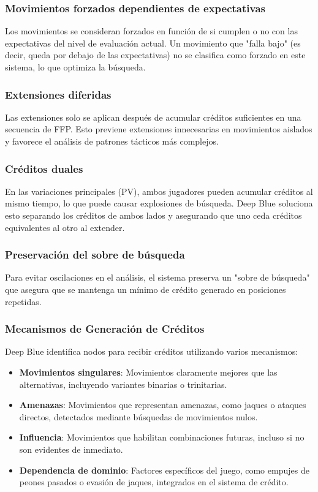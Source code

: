 \documentclass[12pt,a4paper]{article}
\begin{document}
\subsubsection*{Movimientos forzados dependientes de expectativas}
Los movimientos se consideran forzados en función de si cumplen o no con las expectativas del nivel de evaluación actual. Un movimiento que "falla bajo" (es decir, queda por debajo de las expectativas) no se clasifica como forzado en este sistema, lo que optimiza la búsqueda.

\subsubsection*{Extensiones diferidas}
Las extensiones solo se aplican después de acumular créditos suficientes en una secuencia de FFP. Esto previene extensiones innecesarias en movimientos aislados y favorece el análisis de patrones tácticos más complejos.

\subsubsection*{Créditos duales}
En las variaciones principales (PV), ambos jugadores pueden acumular créditos al mismo tiempo, lo que puede causar explosiones de búsqueda. Deep Blue soluciona esto separando los créditos de ambos lados y asegurando que uno ceda créditos equivalentes al otro al extender.

\subsubsection*{Preservación del sobre de búsqueda}
Para evitar oscilaciones en el análisis, el sistema preserva un "sobre de búsqueda" que asegura que se mantenga un mínimo de crédito generado en posiciones repetidas.

\subsubsection*{Mecanismos de Generación de Créditos}
Deep Blue identifica nodos para recibir créditos utilizando varios mecanismos:
\begin{itemize}
    \item \textbf{Movimientos singulares}: Movimientos claramente mejores que las alternativas, incluyendo variantes binarias o trinitarias.
    \item \textbf{Amenazas}: Movimientos que representan amenazas, como jaques o ataques directos, detectados mediante búsquedas de movimientos nulos.
    \item \textbf{Influencia}: Movimientos que habilitan combinaciones futuras, incluso si no son evidentes de inmediato.
    \item \textbf{Dependencia de dominio}: Factores específicos del juego, como empujes de peones pasados o evasión de jaques, integrados en el sistema de crédito.
\end{itemize}
\end{document}
